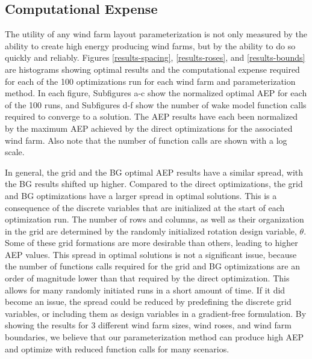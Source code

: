\documentclass[wes, manuscript]{copernicus}
\begin{document}
\subsection{Computational Expense}
The utility of any wind farm layout parameterization is not only measured by the ability to create high energy producing wind farms, but by the ability to do so quickly and reliably. Figures \ref{results-spacing}, \ref{results-roses}, and \ref{results-bounds} are histograms showing optimal results and the computational expense required for each of the 100 optimizations run for each wind farm and parameterization method. In each figure, Subfigures a-c show the normalized optimal AEP for each of the 100 runs, and Subfigures d-f show the number of wake model function calls required to converge to a solution. The AEP results have each been normalized by the maximum AEP achieved by the direct optimizations for the associated wind farm. Also note that the number of function calls are shown with a log scale.

In general, the grid and the BG optimal AEP results have a similar spread, with the BG results shifted up higher. Compared to the direct optimizations, the grid and BG optimizations have a larger spread in optimal solutions. This is a consequence of the discrete variables that are initialized at the start of each optimization run. The number of rows and columns, as well as their organization in the grid are determined by the randomly initialized rotation design variable, $\theta$. Some of these grid formations are more desirable than others, leading to higher AEP values. This spread in optimal solutions is not a significant issue, because the number of functions calls required for the grid and BG optimizations are an order of magnitude lower than that required by the direct optimization. This allows for many randomly initiated runs in a short amount of time. If it did become an issue, the spread could be reduced by predefining the discrete grid variables, or including them as design variables in a gradient-free formulation. By showing the results for 3 different wind farm sizes, wind roses, and wind farm boundaries, we believe that our parameterization method can produce high AEP and optimize with reduced function calls for many scenarios.
\end{document}
